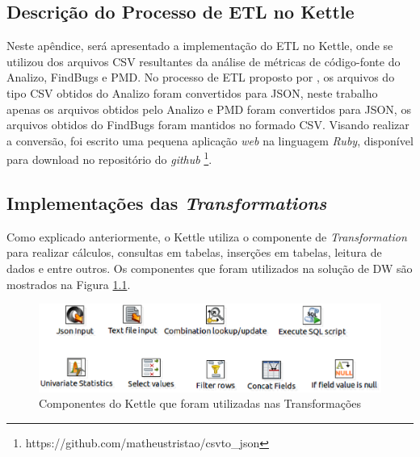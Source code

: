 \begin{apendicesenv}

\chapter{Descrição do Processo de ETL no Kettle}
\label{sec:implementação-etl}

Neste apêndice, será apresentado a implementação do ETL no Kettle, onde se utilizou dos arquivos CSV resultantes da análise de métricas de código-fonte do Analizo, FindBugs e PMD.
No processo de ETL proposto por , os arquivos do tipo CSV obtidos do Analizo foram convertidos para JSON, neste trabalho apenas os arquivos obtidos pelo Analizo e PMD foram convertidos para JSON, os arquivos obtidos do FindBugs foram mantidos no formado CSV. Visando realizar a conversão, foi escrito uma pequena aplicação \textit{web} na linguagem \textit{Ruby}, disponível para download no repositório do \textit{github} \footnote{https://github.com/matheustristao/csvto\_json}. 


\section{Implementações das \textit{Transformations}}


Como explicado anteriormente, o Kettle utiliza o componente de \textit{Transformation} para realizar cálculos, consultas em tabelas, inserções em tabelas, leitura de dados e entre outros. Os componentes que foram utilizados na solução de DW são mostrados na Figura \ref{fig:componentsetl}.


\begin{figure}[h!]
\centering
\includegraphics[keepaspectratio=false,scale=0.45]{figuras/figuras_nilton/componentsetl.eps}
\caption{Componentes do Kettle que foram utilizadas nas Transformações}
\label{fig:componentsetl}
\end{figure}


\end{apendicesenv}
